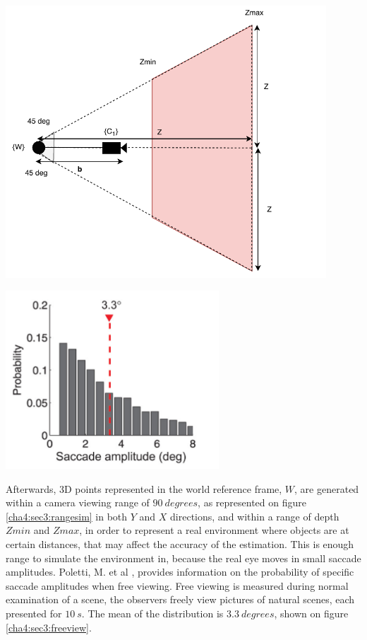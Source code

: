 \begin{minipage}{0.5\textwidth}
	\centering
	\includegraphics[width=0.9\textwidth]{images/rangesim.pdf}
	\label{cha4:sec3:rangesim}
\end{minipage}
\begin{minipage}{0.5\textwidth}
	\centering
	\includegraphics[width=0.6\textwidth]{images/freeview.png}
	\label{cha4:sec3:freeview}
\end{minipage}

Afterwards, 3D points represented in the world reference frame, ${W}$, are generated within a camera viewing range of $90 \ degrees$, as represented on figure \ref{cha4:sec3:rangesim} in both $Y$ and $X$ directions, and within a range of depth $Zmin$ and $Zmax$, in order to represent a real environment where objects are at certain distances, that may affect the accuracy of the estimation. This is enough range to simulate the environment in, because the real eye moves in small saccade amplitudes. Poletti, M. et al \cite{saccadeamp}, provides information on the probability of specific \gls{saccade} amplitudes when free viewing. Free viewing is measured during normal examination of a scene, the observers freely view pictures of natural scenes, each presented for $10 \ s$. The mean of the distribution is $3.3 \ degrees$, shown on figure \ref{cha4:sec3:freeview}.

